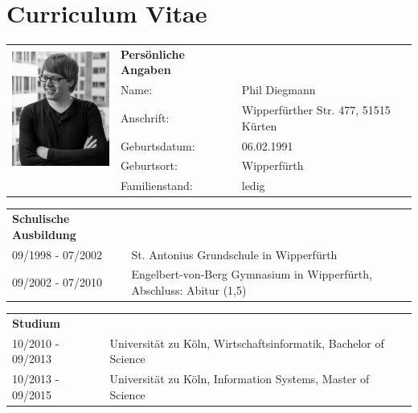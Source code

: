\section*{\hspace{0.2cm}Curriculum Vitae} 

\begin{flushleft}

\begin{tabular}{p{11em} p{10em} p{10em}}
    \multirow{5}{*}{\includegraphics[width=40mm]{figures/passfoto.jpg}} & \textbf{Persönliche Angaben} & \addspace \\
    & Name: & Phil Diegmann \\
    & Anschrift: & Wipperfürther Str. 477, 51515 Kürten \\
    & Geburtsdatum: & 06.02.1991 \\
    & Geburtsort: & Wipperfürth \\
    & Familienstand: & ledig \\
\end{tabular}

\vspace{1.5em}

\begin{tabular}{p{11em} p{22.5em}}
    \textbf{Schulische Ausbildung} & \addspace \\
    09/1998 - 07/2002 & St. Antonius Grundschule in Wipperfürth \\
    09/2002 - 07/2010 & Engelbert-von-Berg Gymnasium in Wipperfürth, Abschluss: Abitur (1,5) \\
\end{tabular}

\vspace{0.5em}

\begin{tabular}{p{11em} p{22.5em}}
    \textbf{Studium} & \addspace \\
    10/2010 - 09/2013 & Universität zu Köln, Wirtschaftsinformatik, Bachelor of Science \\
    10/2013 - 09/2015 & Universität zu Köln, Information Systems, Master of Science\\
\end{tabular}


\end{flushleft}

